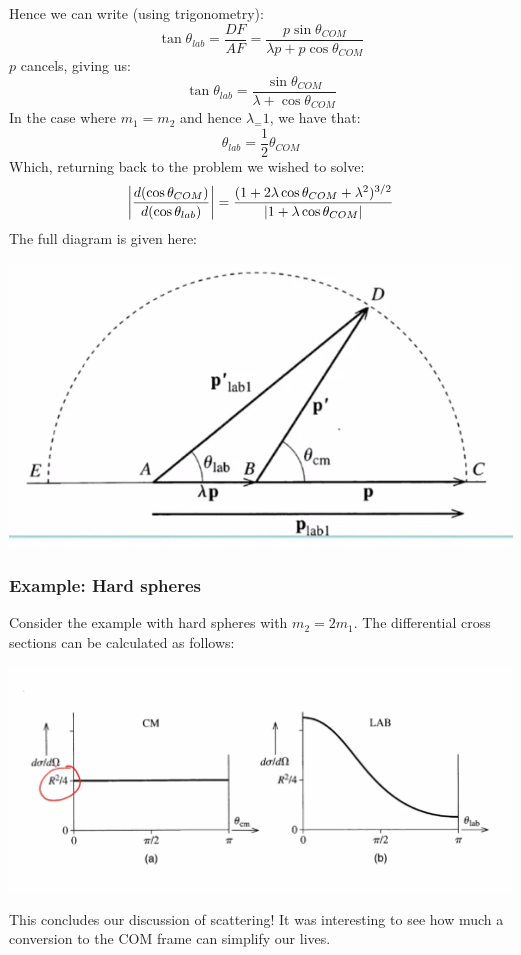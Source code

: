 \documentclass[../PHYS306Notes.tex]{subfiles}
\begin{document}
Hence we can write (using trigonometry):
\[\tan\theta_{lab} = \frac{DF}{AF} = \frac{p\sin\theta_{COM}}{\lambda p + p\cos\theta_{COM}}\]
$p$ cancels, giving us:
\[\tan\theta_{lab} = \frac{\sin\theta_{COM}}{\lambda + \cos\theta_{COM}}\]
In the case where $m_1 = m_2$ and hence $\lambda_ = 1$, we have that:
\[\theta_{lab} = \frac{1}{2}\theta_{COM}\]
Which, returning back to the problem we wished to solve:
\[\abs{\frac{d(\cos\theta_{COM})}{d(\cos\theta_{lab})}} = \frac{(1 + 2\lambda\cos\theta_{COM} + \lambda^2)^{3/2}}{\abs{1 + \lambda \cos \theta_{COM}}} \]
The full diagram is given here:
\begin{center}
    \includegraphics[scale=0.5]{Lecture-29/l29-img6.png}
\end{center}
\subsubsection{Example: Hard spheres}
Consider the example with hard spheres with $m_2 = 2m_1$. The differential cross sections can be calculated as follows:
\begin{center}
    \includegraphics[scale=0.5]{Lecture-29/l29-img7.png}
\end{center}
This concludes our discussion of scattering! It was interesting to see how much a conversion to the COM frame can simplify our lives. 
\end{document}
